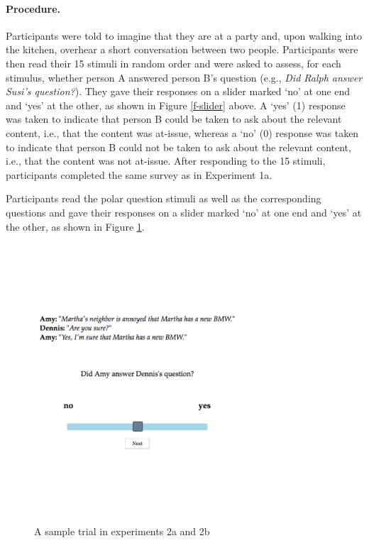 \documentclass[11pt,fleqn]{article}
\newcommand{\6}{\mbox{$[\hspace*{-.6mm}[$}}
\newcommand{\9}{\mbox{$]\hspace*{-.6mm}]$}}
\begin{document}
\paragraph{Procedure.} Participants were told to imagine that they are at a party and, upon walking into the kitchen, overhear a short conversation between two people. Participants were then read their 15 stimuli in random order and were asked to assess, for each stimulus, whether person A answered person B's question (e.g., {\em Did Ralph answer Susi's question?}). They gave their responses on a slider marked `no' at one end and `yes' at the other, as shown in Figure \ref{f-slider} above. A `yes' (1) response was taken to indicate that person B could be taken to ask about the relevant content, i.e., that the content was at-issue, whereas a `no' (0) response was taken to indicate that person B could not be taken to ask about the relevant content, i.e., that the content was not at-issue. After responding to the 15 stimuli, participants completed the same survey as in Experiment 1a.

Participants read the polar question stimuli as well as the corresponding questions and gave their responses on a slider marked `no' at one end and `yes' at the other, as shown in Figure \ref{f-trial-exp2}.  


\begin{figure}[!h]
\begin{center}
\includegraphics[width=8cm]{exp2-trial}
\end{center}
\caption{A sample trial in experiments 2a and 2b}\label{f-trial-exp2}
\end{figure}
\end{document}
